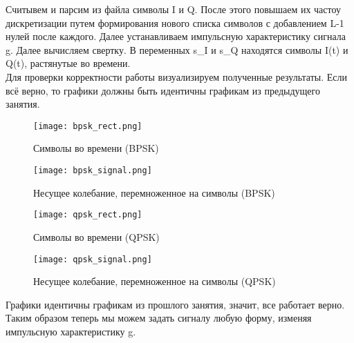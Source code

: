 Считывем и парсим из файла символы I и Q. После этого повышаем их частоу дискретизации путем формирования нового списка символов
с добавлением L-1 нулей после каждого. Далее устанавливаем импульсную характеристику сигнала g. Далее вычисляем свертку. В переменных
s\_I и s\_Q находятся символы I(t) и Q(t), растянутые во времени. \\

Для проверки корректности работы визуализируем полученные результаты. Если всё верно, то графики должны быть идентичны графикам
из предыдущего занятия.

\begin{figure}[H]
    \centering
    \texttt{[image: bpsk\_rect.png]}
    \caption{Символы во времени (BPSK)}
\end{figure}

\begin{figure}[H]
    \centering
    \texttt{[image: bpsk\_signal.png]}
    \caption{Несущее колебание, перемноженное на символы (BPSK)}
\end{figure}


\begin{figure}[H]
    \centering
    \texttt{[image: qpsk\_rect.png]}
    \caption{Символы во времени (QPSK)}
\end{figure}

\begin{figure}[H]
    \centering
    \texttt{[image: qpsk\_signal.png]}
    \caption{Несущее колебание, перемноженное на символы (QPSK)}
\end{figure}

Графики идентичны графикам из прошлого занятия, значит, все работает верно. Таким образом теперь мы можем задать сигналу
любую форму, изменяя импульсную характеристику g. 


\endinput
